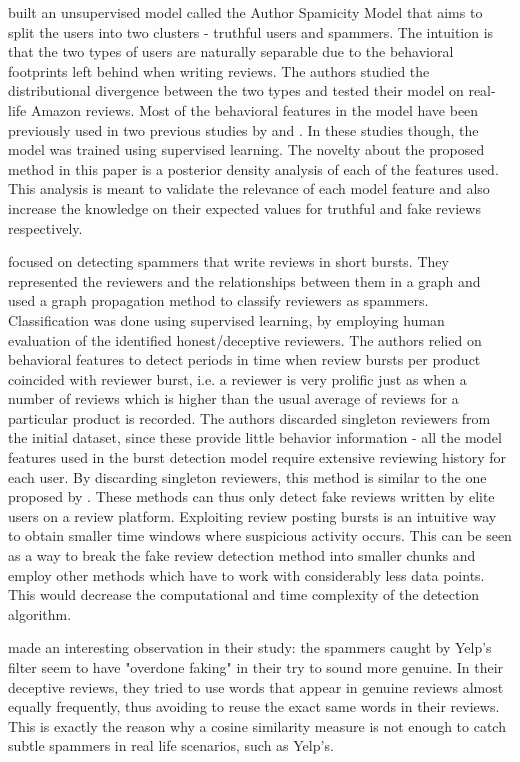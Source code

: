 \citet{Mukherjee2013} built an unsupervised model called the Author Spamicity Model that aims to split the users into two clusters - truthful users and spammers. The intuition is that the two types of users are naturally separable due to the behavioral footprints left behind when writing reviews. The authors studied the distributional divergence between the two types and tested their model on real-life Amazon reviews. Most of the behavioral features in the model have been previously used in two previous studies by \citet{Mukherjee2012} and \citet{Mukherjee2013b}. In these studies though, the model was trained using supervised learning. The novelty about the proposed method in this paper is a posterior density analysis of each of the features used. This analysis is meant to validate the relevance of each model feature and also increase the knowledge on their expected values for truthful and fake reviews respectively.

\citet{Fei2013} focused on detecting spammers that write reviews in short bursts. They represented the reviewers and the relationships between them in a graph and used a graph propagation method to classify reviewers as spammers. Classification was done using supervised learning, by employing human evaluation of the identified honest/deceptive reviewers. The authors relied on behavioral features to detect periods in time when review bursts per product coincided with reviewer burst, i.e. a reviewer is very prolific just as when a number of reviews which is higher than the usual average of reviews for a particular product is recorded. The authors discarded singleton reviewers from the initial dataset, since these provide little behavior information - all the model features used in the burst detection model require extensive reviewing history for each user. By discarding singleton reviewers, this method is similar to the one proposed by \citet{Mukherjee2012}. These methods can thus only detect fake reviews written by elite users on a review platform. Exploiting review posting bursts is an intuitive way to obtain smaller time windows where suspicious activity occurs. This can be seen as a way to break the fake review detection method into smaller chunks and employ other methods which have to work with considerably less data points. This would decrease the computational and time complexity of the detection algorithm. 

\citet{Mukherjee2013a} made an interesting observation in their study: the spammers caught by Yelp's filter seem to have "overdone faking" in their try to sound more genuine. In their deceptive reviews, they tried to use words that appear in genuine reviews almost equally frequently, thus avoiding to reuse the exact same words in their reviews. This is exactly the reason why a cosine similarity measure is not enough to catch subtle spammers in real life scenarios, such as Yelp's. 


